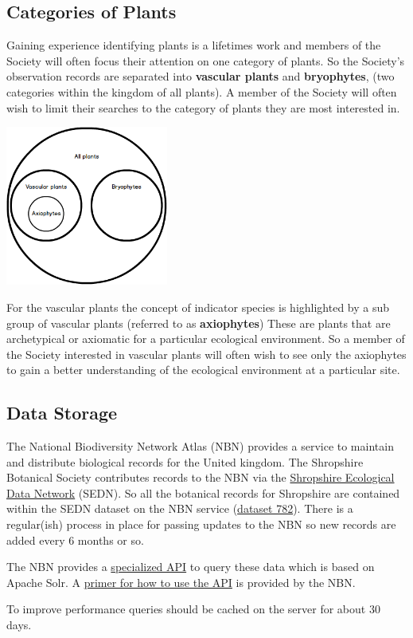 \documentclass[a4paper,12pt,landscape]{article}
\begin{document}
\begin{multicols*}{2}
  \subsection{Categories of Plants}
  Gaining experience identifying plants is a lifetimes work
  and members of the Society will often
  focus their attention on one category of plants.
  So the Society's observation records
  are separated into \textbf{vascular plants} and \textbf{bryophytes},
  (two categories within the kingdom of all plants).
  A member of the Society will often wish to limit their searches to the
  category of plants they are most interested in.

  \includegraphics[width=0.4\textwidth,height=\textheight,keepaspectratio]{./wireframes/Categories.png}

  For the vascular plants
  the concept of indicator species is highlighted
  by a sub group of vascular plants
  (referred to as \textbf{axiophytes})
  These are plants that are archetypical or axiomatic for a particular ecological environment.
  So a member of the Society interested in vascular plants
  will often wish to see only the axiophytes
  to gain a better understanding of the ecological environment
  at a particular site.

  \subsection{Data Storage}
  The National Biodiversity Network Atlas (NBN)
  provides a service to maintain and distribute biological records
  for the United kingdom.
  The Shropshire Botanical Society contributes records to the NBN
  via the \href{https://sites.google.com/view/sedn/home}{Shropshire Ecological Data Network} (SEDN).
  So all the botanical records for Shropshire
  are contained within the SEDN dataset on the NBN service
  (\href{occurrences/search?q=data_resource_uid%3Adr782}{dataset 782}).
  There is a regular(ish) process in place for passing updates to the NBN
  so new records are added every 6 months or so. 

  The NBN provides a \href{https://api.nbnatlas.org/}{specialized API}
  to query these data which is based on Apache Solr.
  A \href{http://docs.shropshirebotany.org.uk/NBN%20Atlas%20Query%20Primer.pdf}{primer for how to use the API}
  is provided by the NBN.

  \begin{todolist}
    \item To improve performance queries should be cached on the server for about 30 days.
  \end{todolist}

\end{multicols*}
\end{document}
